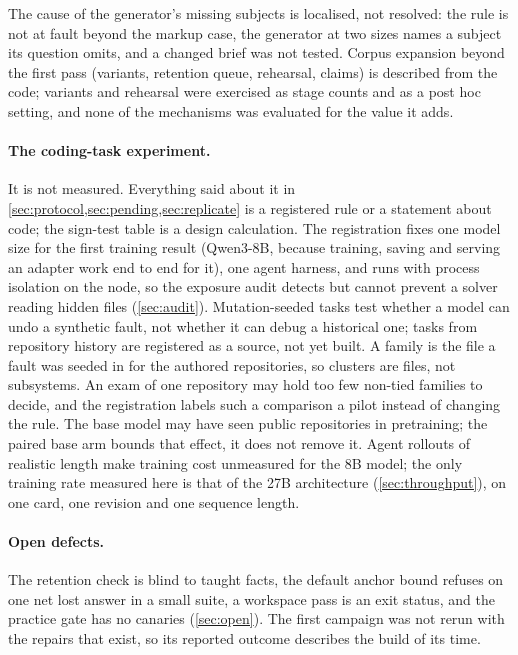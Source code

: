 The cause of the generator's missing subjects is localised, not resolved: the rule is not at fault
beyond the markup case, the generator at two sizes names a subject its question omits, and a changed
brief was not tested. Corpus expansion beyond the first pass (variants, retention queue,
rehearsal, claims) is described from the code; variants and rehearsal were exercised as stage
counts and as a post hoc setting, and none of the mechanisms was evaluated for the value it adds.

\paragraph{The coding-task experiment.} It is not measured. Everything said about it in
\cref{sec:protocol,sec:pending,sec:replicate} is a registered rule or a statement about code; the
sign-test table is a design calculation. The registration fixes one model size for the first
training result (Qwen3-8B, because training, saving and serving an adapter work end to end for
it), one agent harness, and runs with process isolation  on the node, so the exposure
audit detects but cannot prevent a solver reading hidden files (\cref{sec:audit}). Mutation-seeded
tasks test whether a model can undo a synthetic fault, not whether it can debug a historical one;
tasks from repository history are registered as a source, not yet built. A family is the file a
fault was seeded in for the authored repositories, so clusters are files, not subsystems.
An exam of one repository may hold too few non-tied families to decide, and the registration
labels such a comparison a pilot instead of changing the rule. The base model may have seen
public repositories in pretraining; the paired base arm bounds that effect, it does not remove it.
Agent rollouts of realistic length make training cost unmeasured for the 8B model; the only
training rate measured here is that of the 27B architecture (\cref{sec:throughput}), on one card,
one revision and one sequence length.

\paragraph{Open defects.} The retention check is blind to taught facts, the default anchor bound
refuses on one net lost answer in a small suite, a workspace pass is an exit status, and the
practice gate has no canaries (\cref{sec:open}). The first campaign was not rerun with the
repairs that exist, so its reported outcome describes the build of its time.


